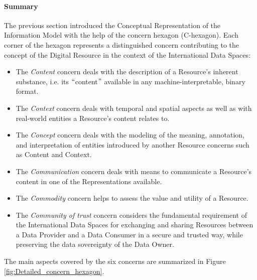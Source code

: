 
\paragraph{Summary\\}
The previous section introduced the Conceptual Representation of the Information Model with the help of the concern hexagon (C-hexagon). Each corner of the hexagon represents a distinguished concern contributing to the concept of the Digital Resource in the context of the International Data Spaces: 

\begin{itemize}
	\item The \textit{Content} concern deals with the description of a Resource’s inherent substance, i.e. its $``$content$"$  available in any machine-interpretable, binary format. 

	\item The \textit{Context} concern deals with temporal and spatial aspects as well as with real-world entities a Resource’s content relates to. 

	\item The \textit{Concept} concern deals with the modeling of the meaning, annotation, and interpretation of entities introduced by another Resource concerns such as Content and Context. 

	\item The \textit{Communication} concern deals with means to communicate a Resource’s content in one of the Representations available. 

	\item The \textit{Commodity }concern helps to assess the value and utility of a Resource. 

	\item The \textit{Community of trust} concern considers the fundamental requirement of the International Data Spaces for exchanging and sharing Resources between a Data Provider and a Data Consumer in a secure and trusted way, while preserving the data sovereignty of the Data Owner.

\end{itemize}

The main aspects covered by the six concerns are summarized in Figure \ref{fig:Detailed_concern_hexagon}.



